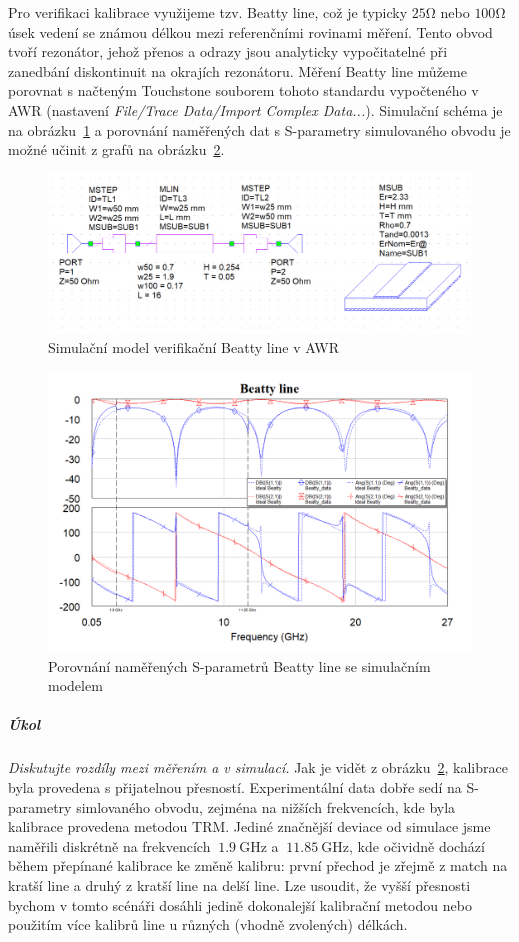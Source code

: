 \documentclass[11pt,a4paper]{article}
\newcommand{\Ohm}{\mathrm{\Omega}}
\newcommand{\GHz}{\mathrm{GHz}}
\begin{document}
Pro verifikaci kalibrace využijeme tzv. Beatty line, což je typicky $25\Ohm$ nebo $100\Ohm$ úsek vedení se známou délkou mezi referenčními rovinami měření. Tento obvod tvoří rezonátor, jehož přenos a odrazy jsou analyticky vypočitatelné při zanedbání diskontinuit na okrajích rezonátoru. Měření Beatty line můžeme porovnat s načteným Touchstone souborem tohoto standardu vypočteného v AWR (nastavení \emph{File/Trace Data/Import Complex Data...}). Simulační schéma je na obrázku~\ref{fig:beatty-line-awr} a porovnání naměřených dat s S-parametry simulovaného obvodu je možné učinit z grafů na obrázku~\ref{fig:beatty-line}.
\begin{figure}[!ht]
    \centering
    \includegraphics[width=.8\textwidth]{src/beatty-line-awr.png}
    \caption{\label{fig:beatty-line-awr}Simulační model verifikační Beatty line v AWR}
\end{figure}
\begin{figure}[!ht]
    \centering
    \includegraphics[width=.9\textwidth]{src/beatty-line.png}
    \caption{\label{fig:beatty-line}Porovnání naměřených S-parametrů Beatty line se simulačním modelem}
\end{figure}
\subparagraph*{Úkol} \emph{Diskutujte rozdíly mezi měřením a v simulací.} Jak je vidět z obrázku~\ref{fig:beatty-line}, kalibrace byla provedena s přijatelnou přesností. Experimentální data dobře sedí na S-parametry simlovaného obvodu, zejména na nižších frekvencích, kde byla kalibrace provedena metodou TRM. Jediné značnější deviace od simulace jsme naměřili diskrétně na frekvencích $~1.9\ \GHz$ a $~11.85\ \GHz$, kde očividně dochází během přepínané kalibrace ke změně kalibru: první přechod je zřejmě z match na kratší line a druhý z kratší line na delší line. Lze usoudit, že vyšší přesnosti bychom v tomto scénáři dosáhli jedině dokonalejší kalibrační metodou nebo použitím více kalibrů line u různých (vhodně zvolených) délkách.
\end{document}
